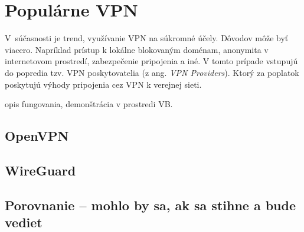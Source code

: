 \chapter{Populárne VPN}\label{zlozitejsia vpn}
V~súčasnosti je trend, využívanie VPN na súkromné účely. Dôvodov môže byť viacero. Napríklad prístup k lokálne blokovaným doménam, anonymita v internetovom prostredí, zabezpečenie pripojenia a iné. V tomto prípade vstupujú do popredia tzv. VPN poskytovatelia (z ang. \textit{VPN Providers}). Ktorý za poplatok poskytujú výhody pripojenia cez VPN k verejnej sieti.

opis fungovania, demonštrácia v prostredi VB.
\section{OpenVPN}
\section{WireGuard}
\section{Porovnanie -- mohlo by sa, ak sa stihne a bude vediet}
